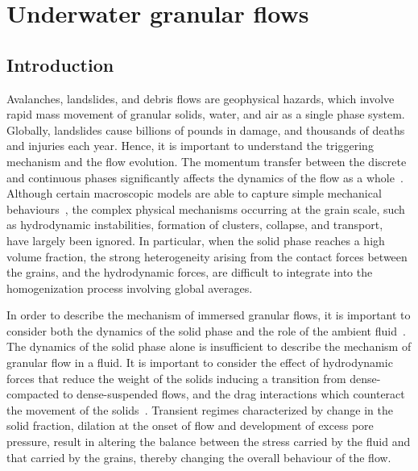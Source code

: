 \chapter{Underwater granular flows}

\ifpdf
    \graphicspath{{Chapter6/figs/raster/}{Chapter6/figs/pdf/}{Chapter6/figs/}}
\else
    \graphicspath{{Chapter6/figs/vector/}{Chapter6/figs/}}
\fi

\section{Introduction}
Avalanches, landslides, and debris flows are geophysical hazards, which involve 
rapid mass movement of granular solids, water, and air as a single phase 
system. Globally, landslides 
cause billions of pounds in damage, and thousands of deaths and injuries each 
year. Hence, it is important to understand the triggering mechanism and the flow
evolution. The momentum transfer between the discrete and continuous 
phases significantly affects the dynamics of the flow as a 
whole~\citep{Topin2012}. Although certain macroscopic models are able to 
capture simple mechanical 
behaviours~\citep{Peker2007}, the complex physical mechanisms occurring at the 
grain scale, such as hydrodynamic instabilities, formation of clusters, 
collapse, and transport,~\citep{Topin2011} have largely been ignored. In 
particular, when the solid phase reaches a high volume fraction, the strong 
heterogeneity arising from the contact forces between the grains, and the 
hydrodynamic forces, are difficult to integrate into the homogenization process 
involving global averages. 

In order to describe the mechanism of immersed 
granular flows, it is important to consider both the dynamics of the solid 
phase and the role of the ambient fluid~\citep{Denlinger2001}. The dynamics of 
the solid phase alone is insufficient to describe the mechanism of granular 
flow in a fluid. It is important to consider the effect of hydrodynamic forces 
that reduce the weight of the solids inducing a transition from dense-compacted 
to dense-suspended flows, and the drag interactions which counteract the 
movement of the solids~\citep{Meruane2010}. Transient regimes characterized by 
change in the solid fraction, dilation at the onset of flow and development of 
excess pore pressure, result in altering the balance between the stress carried 
by the fluid and that carried by the grains, thereby changing the overall 
behaviour of the flow. 


